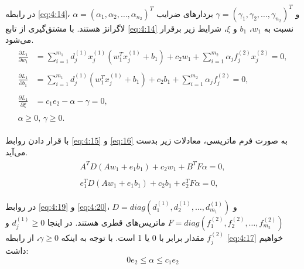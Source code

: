 در رابطه \ref{eq:4:14}،  $\alpha=(\alpha_{1}, \alpha_{2}, \dots,\alpha_{n_{2}})^{T}$ و $\gamma=(\gamma_{1}, \gamma_{2}, \dots, \gamma_{n_{2}})^{T}$ بردارهای ضرایب لاگرانژ هستند. با مشتق‌گیری از تابع \ref{eq:4:14} نسبت به   $w_{1}$،  $b_{1}$ و  $\xi$، شرایط  زیر برقرار می‌شود.
\begin{align}
\label{eq:4:15}
\begin{split}
\frac{\partial L_{1}}{\partial w_{1}}&= \sum\limits_{i=1}^{m_{1}}{d^{(1)}_{j}x^{(1)}_{j}(w^{T}_{1}x^{(1)}_{j} + b_{1})} + c_{2}w_{1} + \sum\limits_{i=1}^{m_{2}}{\alpha_{j}f_{j}^{(2)}x_{j}^{(2)}}=0,
\end{split} \\
\label{eq:4:16}
\begin{split}
\frac{\partial L_{1}}{\partial b_{1}}&= \sum\limits_{i=1}^{m_{1}}{d^{(1)}_{j}(w^{T}_{1}x^{(1)}_{j} + b_{1})} + c_{2}b_{1} +\sum\limits_{i=1}^{m_{2}}{\alpha_{j}f_{j}^{(2)}}=0,
\end{split}\\
\label{eq:4:17}
\begin{split}
\frac{\partial L_{1}}{\partial \xi}&= c_{1}e_{2} - \alpha - \gamma =0,
\end{split}\\
\label{eq:4:18}
\begin{split}
\alpha \geq 0,\, \gamma \geq 0.
\end{split}
\end{align}

با قرار دادن روابط \ref{eq:4:15} و \ref{eq:16}  به صورت فرم ماتریسی، معادلات زیر بدست می‌آید.
\begin{align}
\label{eq:4:19}
\begin{split}
A^{T}D(Aw_{1}+e_{1}b_{1})+c_{2}w_{1}+B^{T}F\alpha=0,
\end{split} \\
\label{eq:4:20}
\begin{split}
e^{T}_{1}D(Aw_{1}+e_{1}b_{1}) + c_{2}b_{1}+e^{T}_{2}F\alpha=0,
\end{split}
\end{align}

در روابط \ref{eq:4:19} و \ref{eq:4:20}،  $D=diag(d^{(1)}_{1},d^{(1)}_{2},\dots,d^{(1)}_{m_{1}})$ و  $F=diag(f^{(2)}_{1},f^{(2)}_{2},\dots,f^{(2)}_{m_{2}})$ ماتریس‌های قطری هستند. در اینجا $d^{(1)}_{j} \geq 0$ و  $f^{(2)}_{j}$ مقدار برابر با 0 یا 1 است. با توجه به اینکه  $\gamma \geq 0$، از رابطه \ref{eq:4:17} خواهیم داشت:
\begin{equation} \label{eq:4:21}
0e_{2} \leq \alpha \leq c_{1}e_{2}
\end{equation}

